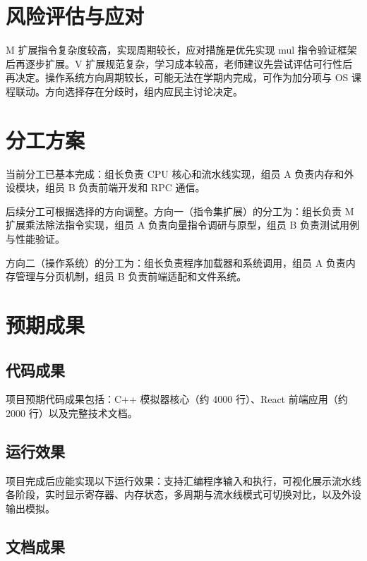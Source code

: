 \documentclass[12pt, a4paper]{article}
\begin{document}
\vspace{1cm}

\section{风险评估与应对}\label{sec:risk}

M 扩展指令复杂度较高，实现周期较长，应对措施是优先实现 mul 指令验证框架后再逐步扩展。V 扩展规范复杂，学习成本较高，老师建议先尝试评估可行性后再决定。操作系统方向周期较长，可能无法在学期内完成，可作为加分项与 OS 课程联动。方向选择存在分歧时，组内应民主讨论决定。

\vspace{1cm}

\section{分工方案}\label{sec:tasks}

当前分工已基本完成：组长负责 CPU 核心和流水线实现，组员 A 负责内存和外设模块，组员 B 负责前端开发和 RPC 通信。

后续分工可根据选择的方向调整。方向一（指令集扩展）的分工为：组长负责 M 扩展乘法除法指令实现，组员 A 负责向量指令调研与原型，组员 B 负责测试用例与性能验证。

方向二（操作系统）的分工为：组长负责程序加载器和系统调用，组员 A 负责内存管理与分页机制，组员 B 负责前端适配和文件系统。

\vspace{1cm}

\section{预期成果}

\subsection{代码成果}

项目预期代码成果包括：C++ 模拟器核心（约 4000 行）、React 前端应用（约 2000 行）以及完整技术文档。

\subsection{运行效果}

项目完成后应能实现以下运行效果：支持汇编程序输入和执行，可视化展示流水线各阶段，实时显示寄存器、内存状态，多周期与流水线模式可切换对比，以及外设输出模拟。

\subsection{文档成果}
\end{document}

